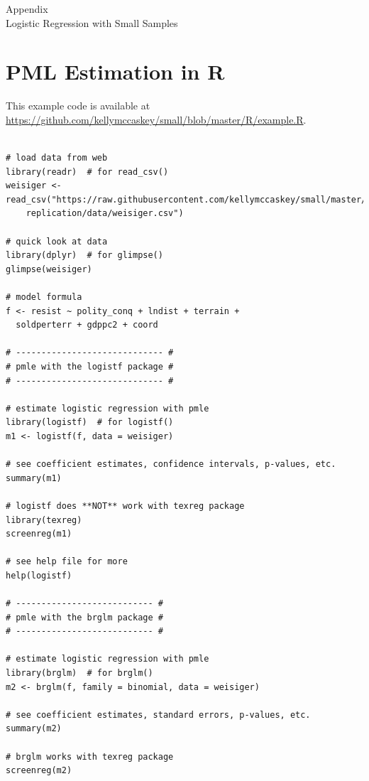\documentclass[12pt]{article}
\begin{document}
\newpage
\begin{appendix}
\begin{center}
{\LARGE Appendix}\\
\vspace{3mm}
{\large Logistic Regression with Small Samples}\\\vspace{2mm}
\end{center}

\section{PML Estimation in R}\label{sec:pmle-in-R}

This example code is available at \href{https://github.com/kellymccaskey/small/blob/master/R/example.R}{https://github.com/kellymccaskey/small/blob/master/R/example.R}.

\begin{footnotesize}
\begin{verbatim}

# load data from web
library(readr)  # for read_csv()
weisiger <- read_csv("https://raw.githubusercontent.com/kellymccaskey/small/master/weisiger-
	replication/data/weisiger.csv")

# quick look at data
library(dplyr)  # for glimpse()
glimpse(weisiger)

# model formula
f <- resist ~ polity_conq + lndist + terrain +
  soldperterr + gdppc2 + coord

# ----------------------------- #
# pmle with the logistf package #
# ----------------------------- #

# estimate logistic regression with pmle
library(logistf)  # for logistf()
m1 <- logistf(f, data = weisiger)

# see coefficient estimates, confidence intervals, p-values, etc.
summary(m1)

# logistf does **NOT** work with texreg package
library(texreg)
screenreg(m1)

# see help file for more
help(logistf)

# --------------------------- #
# pmle with the brglm package #
# --------------------------- #

# estimate logistic regression with pmle
library(brglm)  # for brglm()
m2 <- brglm(f, family = binomial, data = weisiger)

# see coefficient estimates, standard errors, p-values, etc.
summary(m2)

# brglm works with texreg package
screenreg(m2)


\end{verbatim}
\end{footnotesize}
\end{appendix}
\end{document}
